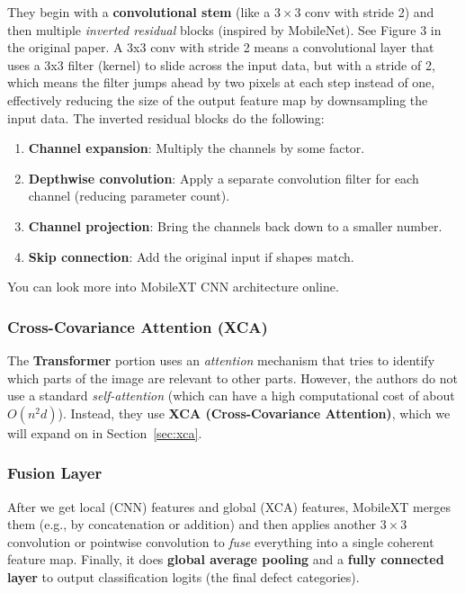 \documentclass{article}
\begin{document}
They begin with a \textbf{convolutional stem} (like a $3\times 3$ conv with stride 2) and then multiple \emph{inverted residual} blocks (inspired by MobileNet). See Figure 3 in the original paper. A 3x3 conv with stride 2 means a convolutional layer that uses a 3x3 filter (kernel) to slide across the input data, but with a stride of 2, which means the filter jumps ahead by two pixels at each step instead of one, effectively reducing the size of the output feature map by downsampling the input data.  
The inverted residual blocks do the following:
\begin{enumerate}
    \item \textbf{Channel expansion}: Multiply the channels by some factor.
    \item \textbf{Depthwise convolution}: Apply a separate convolution filter for each channel (reducing parameter count).
    \item \textbf{Channel projection}: Bring the channels back down to a smaller number.
    \item \textbf{Skip connection}: Add the original input if shapes match.
\end{enumerate}
You can look more into MobileXT CNN architecture online.
\subsubsection{Cross-Covariance Attention (XCA)}

The \textbf{Transformer} portion uses an \emph{attention} mechanism that tries to identify which parts of the image are relevant to other parts. 
However, the authors do not use a standard \emph{self-attention} 
(which can have a high computational cost of about $O(n^2 d)$). 
Instead, they use \textbf{XCA (Cross-Covariance Attention)}, which we will expand on in Section~\ref{sec:xca}. 

\subsubsection{Fusion Layer}

After we get local (CNN) features and global (XCA) features, MobileXT merges them (e.g., by concatenation or addition) 
and then applies another $3\times 3$ convolution or pointwise convolution to \emph{fuse} everything into a single coherent feature map. 
Finally, it does \textbf{global average pooling} and a \textbf{fully connected layer} to output classification logits (the final defect categories).
\end{document}
